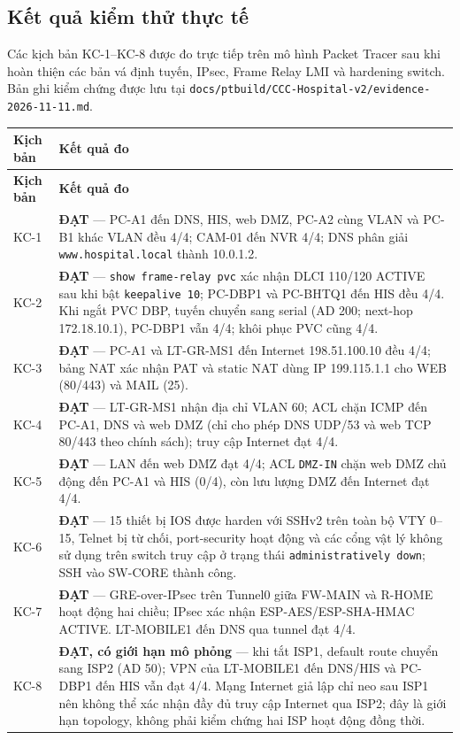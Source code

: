 \subsection{Kết quả kiểm thử thực tế}

Các kịch bản KC-1--KC-8 được đo trực tiếp trên mô hình Packet Tracer sau khi hoàn thiện các bản vá định tuyến, IPsec, Frame Relay LMI và hardening switch. Bản ghi kiểm chứng được lưu tại \texttt{docs/ptbuild/CCC-Hospital-v2/evidence-2026-11-11.md}.

\begin{longtable}{@{}|l|p{}|@{}}
\hline
\textbf{Kịch bản} & \textbf{Kết quả đo} \\
\hline
\endfirsthead
\hline
\textbf{Kịch bản} & \textbf{Kết quả đo} \\
\hline
\endhead
KC-1 & \textbf{ĐẠT} — PC-A1 đến DNS, HIS, web DMZ, PC-A2 cùng VLAN và PC-B1 khác VLAN đều 4/4; CAM-01 đến NVR 4/4; DNS phân giải \texttt{www.hospital.local} thành 10.0.1.2. \\
\hline
KC-2 & \textbf{ĐẠT} — \texttt{show frame-relay pvc} xác nhận DLCI 110/120 ACTIVE sau khi bật \texttt{keepalive 10}; PC-DBP1 và PC-BHTQ1 đến HIS đều 4/4. Khi ngắt PVC DBP, tuyến chuyển sang serial (AD 200; next-hop 172.18.10.1), PC-DBP1 vẫn 4/4; khôi phục PVC cũng 4/4. \\
\hline
KC-3 & \textbf{ĐẠT} — PC-A1 và LT-GR-MS1 đến Internet 198.51.100.10 đều 4/4; bảng NAT xác nhận PAT và static NAT dùng IP 199.115.1.1 cho WEB (80/443) và MAIL (25). \\
\hline
KC-4 & \textbf{ĐẠT} — LT-GR-MS1 nhận địa chỉ VLAN 60; ACL chặn ICMP đến PC-A1, DNS và web DMZ (chỉ cho phép DNS UDP/53 và web TCP 80/443 theo chính sách); truy cập Internet đạt 4/4. \\
\hline
KC-5 & \textbf{ĐẠT} — LAN đến web DMZ đạt 4/4; ACL \texttt{DMZ-IN} chặn web DMZ chủ động đến PC-A1 và HIS (0/4), còn lưu lượng DMZ đến Internet đạt 4/4. \\
\hline
KC-6 & \textbf{ĐẠT} — 15 thiết bị IOS được harden với SSHv2 trên toàn bộ VTY 0--15, Telnet bị từ chối, port-security hoạt động và các cổng vật lý không sử dụng trên switch truy cập ở trạng thái \texttt{administratively down}; SSH vào SW-CORE thành công. \\
\hline
KC-7 & \textbf{ĐẠT} — GRE-over-IPsec trên Tunnel0 giữa FW-MAIN và R-HOME hoạt động hai chiều; IPsec xác nhận ESP-AES/ESP-SHA-HMAC ACTIVE. LT-MOBILE1 đến DNS qua tunnel đạt 4/4. \\
\hline
KC-8 & \textbf{ĐẠT, có giới hạn mô phỏng} — khi tắt ISP1, default route chuyển sang ISP2 (AD 50); VPN của LT-MOBILE1 đến DNS/HIS và PC-DBP1 đến HIS vẫn đạt 4/4. Mạng Internet giả lập chỉ neo sau ISP1 nên không thể xác nhận đầy đủ truy cập Internet qua ISP2; đây là giới hạn topology, không phải kiểm chứng hai ISP hoạt động đồng thời. \\
\hline
\end{longtable}

